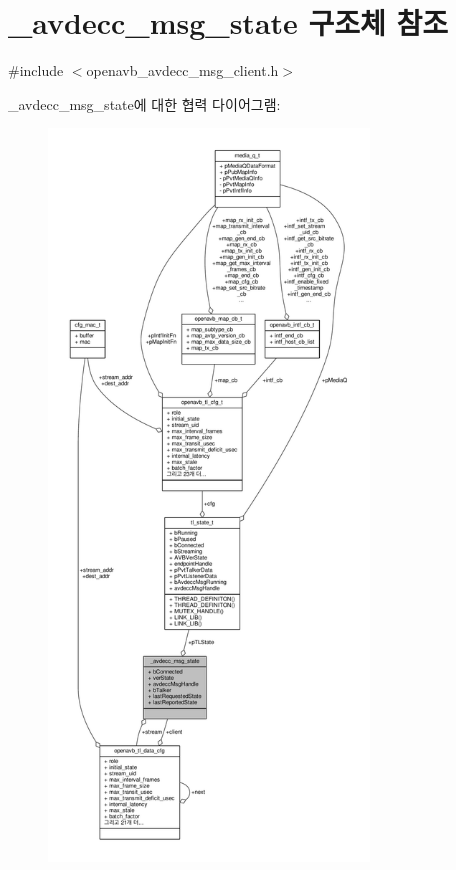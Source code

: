 \hypertarget{struct__avdecc__msg__state}{}\section{\+\_\+avdecc\+\_\+msg\+\_\+state 구조체 참조}
\label{struct__avdecc__msg__state}


{\ttfamily \#include $<$openavb\+\_\+avdecc\+\_\+msg\+\_\+client.\+h$>$}



\+\_\+avdecc\+\_\+msg\+\_\+state에 대한 협력 다이어그램\+:
\nopagebreak
\begin{figure}[H]
\begin{center}
\leavevmode
\includegraphics[height=550pt]{struct__avdecc__msg__state__coll__graph}
\end{center}
\end{figure}
